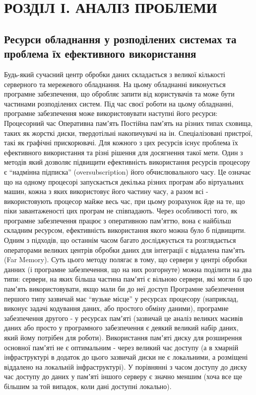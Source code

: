 \pagebreak

\chapter{РОЗДІЛ І. АНАЛІЗ ПРОБЛЕМИ}
\section{Ресурси обладнання у розподілених системах та проблема їх ефективного використання}
Будь-який сучасний центр обробки даних складається з великої кількості серверного та мережевого обладнання. На цьому обладнанні виконується програмне забезпечення, що обробляє запити від користувачів та може бути частинами розподілених систем.
	Під час своєї роботи на цьому обладнанні, програмне забезпечення може використовувати наступні його ресурси:
Процесорний час
Оперативна памʼять
Постійна памʼять на різних типах сховища, таких як жорсткі диски, твердотільні накопичувачі на ін.
Спеціалізовані пристрої, такі як графічні прискорювачі.
	Для кожного з цих ресурсів існує проблема їх ефективного використання та різні рішення для досягнення такої мети. 
	Один з методів який дозволяє підвищити ефективність використання ресурсів процесору є “надмінна підписка” (oversubscription) його обчислювального часу. Це означає що на одному процесорі запускається декілька різних програм або віртуальних машин, кожна з яких використовує його частину часу, а разом всі - використовують процесор майже весь час, при цьому розрахунок йде на те, що піки завантаженості цих програм не співпадають.
	Через особливості того, як програмне забезпечення працює з оперативною памʼяттю, вона є найбільш складним ресурсом, ефективність використання якого можна було б підвищити. Одним з підходів, що останнім часом багато досліджується та розглядається операторами великих центрів обробки даних для інтеграції є віддалена памʼять (Far Memory).
	Суть цього методу полягає в тому, що сервери у центрі обробки данних (і програмне забезпечення, що на них розгорнуте) можна поділити на два типи: 
сервери, на яких більша частина памʼяті є вільною
сервери, які могли б цю памʼять використовувати, якщо мали би до неї доступ
	Програмне забезпечення першого типу зазвичай має “вузьке місце” у ресурсах процесору (наприклад, виконує задачі кодування даних, або простого обміну даними), програмне забезпечення другого - у ресурсах памʼяті (зазвичай це аналіз великих масивів даних або просто у програмного забезпечення є деякий великий набір даних, який йому потрібен для роботи). Використання памʼяті диску для розширення основної памʼяті не є оптимальним - через великий час доступу (а в хмарній інфраструктурі в додаток до цього зазвичай диски не є локальними, а розміщені віддалено на локальній інфраструктурі). У порівнянні з часом доступу до диску час доступу до даних у памʼяті іншого серверу є значно меншим (хоча все ще більшим за той випадок, коли дані доступні локально).

